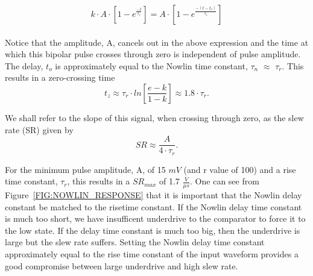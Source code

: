 \documentclass[12pt, onecolumn]{IEEEtran}
\begin{document}
\begin{equation}
k \cdot A \cdot \left[ 1 - e^{\frac{-t}{\tau_r}} \right] = A \cdot \left[ 1 - e^{\frac{-(t - t_o)}{\tau_r}} \right]
\end{equation}\\

Notice that the amplitude, A, cancels out in the above expression and the time at which this bipolar pulse crosses through zero is independent of pulse amplitude. The delay, $t_o$ is approximately equal to the Nowlin time constant, $\tau_n$ $\approx $ $\tau_r$. This results in a zero-crossing time\\

\begin{equation}
t_z \approx \tau_r \cdot ln \left[ \frac{e - k}{1-k}\right] \approx 1.8 \cdot \tau_r.
\end{equation}

We shall refer to the slope of this signal, when crossing through zero, as the slew rate (SR) given by\\

\begin{equation}
SR \approx \frac{A}{4 \cdot \tau_r}.
\end{equation}


For the minimum pulse amplitude, A, of 15 $mV$ (and r value of 100) and a rise time constant, $\tau_r$, this results in a $SR_{max}$ of 1.7 $\frac{V}{\mu s}$. One can see from Figure~\ref{FIG:NOWLIN_RESPONSE} that it is important that the Nowlin delay constant be matched to the risetime constant. If the Nowlin delay time constant is much too short, we have insufficent underdrive to the comparator to force it to the low state.  If the delay time constant is much too big, then the underdrive is large but the slew rate suffers. Setting the Nowlin delay time constant approximately equal to the rise time constant of the input waveform provides a good compromise between large underdrive and high slew rate.\\
\end{document}
